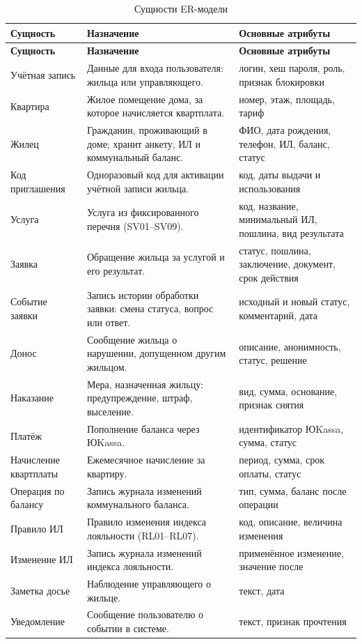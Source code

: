 \documentclass[12pt,a4paper]{article}
\begin{document}
\begin{longtable}{L{37.2mm} L{66.6mm} L{52.9mm}}
\caption{Сущности ER-модели}\label{tab:entities}\\
\toprule \textbf{Сущность} & \textbf{Назначение} & \textbf{Основные атрибуты} \\ \midrule
\endfirsthead
\toprule \textbf{Сущность} & \textbf{Назначение} & \textbf{Основные атрибуты} \\ \midrule
\endhead
\bottomrule
\endfoot
Учётная запись & Данные для входа пользователя: жильца или управляющего. & логин, хеш пароля, роль, признак блокировки \\
Квартира & Жилое помещение дома, за которое начисляется квартплата. & номер, этаж, площадь, тариф \\
Жилец & Гражданин, проживающий в доме; хранит анкету, ИЛ и коммунальный баланс. & ФИО, дата рождения, телефон, ИЛ, баланс, статус \\
Код приглашения & Одноразовый код для активации учётной записи жильца. & код, даты выдачи и использования \\
Услуга & Услуга из фиксированного перечня (SV01--SV09). & код, название, минимальный ИЛ, пошлина, вид результата \\
Заявка & Обращение жильца за услугой и его результат. & статус, пошлина, заключение, документ, срок действия \\
Событие заявки & Запись истории обработки заявки: смена статуса, вопрос или ответ. & исходный и новый статус, комментарий, дата \\
Донос & Сообщение жильца о нарушении, допущенном другим жильцом. & описание, анонимность, статус, решение \\
Наказание & Мера, назначенная жильцу: предупреждение, штраф, выселение. & вид, сумма, основание, признак снятия \\
Платёж & Пополнение баланса через ЮKassa. & идентификатор ЮKassa, сумма, статус \\
Начисление квартплаты & Ежемесячное начисление за квартиру. & период, сумма, срок оплаты, статус \\
Операция по балансу & Запись журнала изменений коммунального баланса. & тип, сумма, баланс после операции \\
Правило ИЛ & Правило изменения индекса лояльности (RL01--RL07). & код, описание, величина изменения \\
Изменение ИЛ & Запись журнала изменений индекса лояльности. & применённое изменение, значение после \\
Заметка досье & Наблюдение управляющего о жильце. & текст, дата \\
Уведомление & Сообщение пользователю о событии в системе. & текст, признак прочтения \\
\end{longtable}
\end{document}

